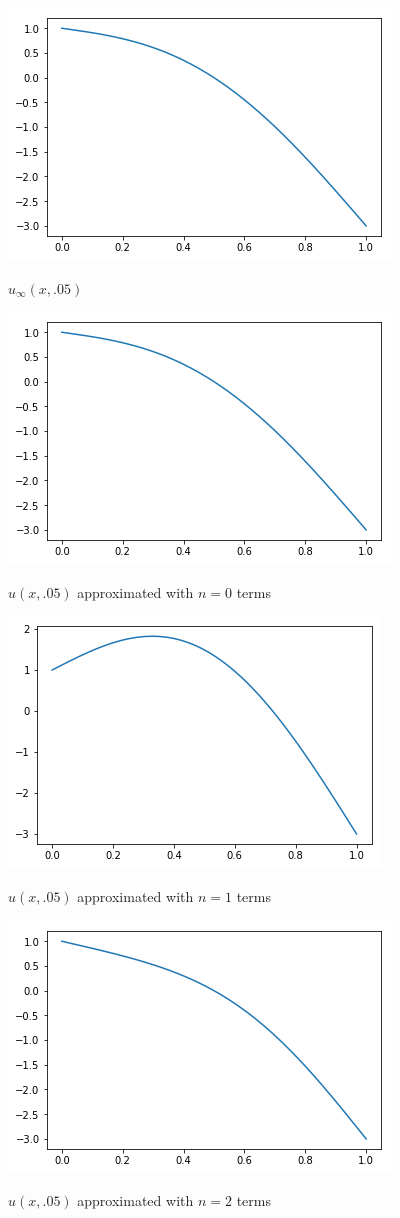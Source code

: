 \documentclass[12pt]{article}
\begin{document}
	
\begin{figure}[H]
	\caption{$u_\infty(x,.05)$}
	\includegraphics[width=.5\textwidth]{tk01_figure_2}
	\label{fig2}
	\centering
\end{figure}
\begin{figure}[H]
	\caption{$u(x,.05)$ approximated with $n=0$ terms}
	\includegraphics[width=.5\textwidth]{tk01_figure_2}
	\label{fig2}
	\centering
\end{figure}
\begin{figure}[H]
	\caption{$u(x,.05)$ approximated with $n=1$ terms}
	\includegraphics[width=.5\textwidth]{tk01_figure_3}
	\label{fig2}
	\centering
\end{figure}
\begin{figure}[H]
	\caption{$u(x,.05)$ approximated with $n=2$ terms}
	\includegraphics[width=.5\textwidth]{tk01_figure_4}
	\label{fig2}
	\centering
\end{figure}
\end{document}
